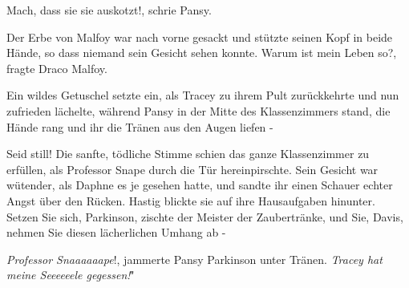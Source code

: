 \glqq{}Mach, dass sie sie auskotzt!\grqq{}, schrie Pansy.

Der Erbe von Malfoy war nach vorne gesackt und stützte seinen Kopf in beide
Hände, so dass niemand sein Gesicht sehen konnte. \glqq{}Warum ist mein Leben
so?\grqq{}, fragte Draco Malfoy.

Ein wildes Getuschel setzte ein, als Tracey zu ihrem Pult zurückkehrte und nun
zufrieden lächelte, während Pansy in der Mitte des Klassenzimmers stand, die
Hände rang und ihr die Tränen aus den Augen liefen -

\glqq{}Seid still!\grqq{} Die sanfte, tödliche Stimme schien das ganze
Klassenzimmer zu erfüllen, als Professor Snape durch die Tür hereinpirschte.
Sein Gesicht war wütender, als Daphne es je gesehen hatte, und sandte ihr einen
Schauer echter Angst über den Rücken. Hastig blickte sie auf ihre Hausaufgaben
hinunter. \glqq{}Setzen Sie sich, Parkinson\grqq{}, zischte der Meister der
Zaubertränke, \glqq{}und Sie, Davis, nehmen Sie diesen lächerlichen Umhang ab
-\grqq{}

\glqq{}\emph{Professor Snaaaaaape}!\grqq{}, jammerte Pansy Parkinson unter
Tränen. \glqq{}\emph{Tracey hat} \emph{meine Seeeeeele gegessen!}"

